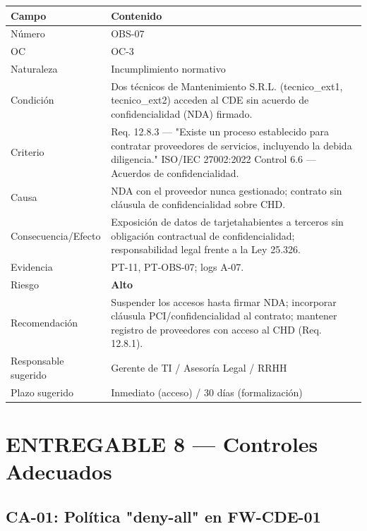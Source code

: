 \documentclass[11pt,a4paper]{article}
\begin{document}
\begin{tabularx}{\textwidth}{P{5cm}L}
\toprule
\textbf{Campo} & \textbf{Contenido} \\
\midrule
Número & OBS-07 \\
OC & OC-3 \\
Naturaleza & Incumplimiento normativo \\
Condición & Dos técnicos de Mantenimiento S.R.L. (tecnico_ext1, tecnico_ext2) acceden al CDE sin acuerdo de confidencialidad (NDA) firmado. \\
Criterio & Req. 12.8.3 — "Existe un proceso establecido para contratar proveedores de servicios, incluyendo la debida diligencia." ISO/IEC 27002:2022 Control 6.6 — Acuerdos de confidencialidad. \\
Causa & NDA con el proveedor nunca gestionado; contrato sin cláusula de confidencialidad sobre CHD. \\
Consecuencia/Efecto & Exposición de datos de tarjetahabientes a terceros sin obligación contractual de confidencialidad; responsabilidad legal frente a la Ley 25.326. \\
Evidencia & PT-11, PT-OBS-07; logs A-07. \\
Riesgo & \textbf{Alto} \\
Recomendación & Suspender los accesos hasta firmar NDA; incorporar cláusula PCI/confidencialidad al contrato; mantener registro de proveedores con acceso al CHD (Req. 12.8.1). \\
Responsable sugerido & Gerente de TI / Asesoría Legal / RRHH \\
Plazo sugerido & Inmediato (acceso) / 30 días (formalización) \\
\bottomrule
\end{tabularx}

\clearpage

\section{ENTREGABLE 8 — Controles Adecuados}

\subsection{CA-01: Política "deny-all" en FW-CDE-01}
\end{document}
